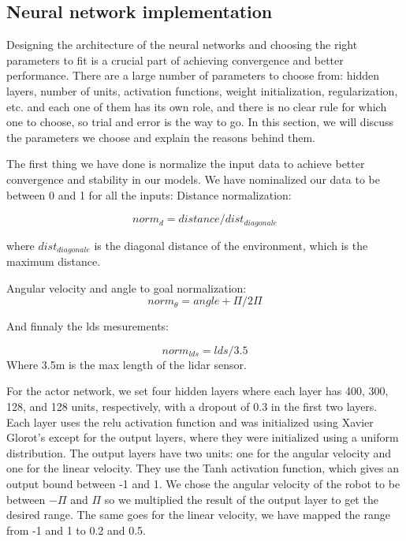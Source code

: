 \documentclass[12pt]{extarticle}
\begin{document}
 
\newpage




\subsection{Neural network implementation}
Designing the architecture of the neural networks and choosing the right parameters to fit is a crucial part of achieving convergence and better performance. There are a large number of parameters to choose from: hidden layers, number of units, activation functions, weight initialization, regularization, etc. and each one of them has its own role, and there is no clear rule for which one to choose, so trial and error is the way to go. In this section, we will discuss the parameters we choose and explain the reasons behind them.
 
The first thing we have done is normalize the input data to achieve better convergence and stability in our models. We have nominalized our data to be between 0 and 1 for all the inputs:
\newpage
Distance normalization:

  \begin{equation} \label{dist_norm}
     norm_d=distance/dist_{diagonale} 
   \end{equation}
   
where $dist_{diagonale}$ is the diagonal distance of the environment, which is the maximum distance.

Angular velocity and angle to goal normalization:
\begin{equation} \label{angle_norm}
     norm_\theta=angle+\Pi/2\Pi
   \end{equation}

And finnaly the lds mesurements:

 \begin{equation} \label{angle_norm}
     norm_{lds}=lds/3.5 
   \end{equation}
  Where 3.5m is the max length of the lidar sensor.
   
For the actor network, we set four hidden layers where each layer has 400, 300, 128, and 128 units, respectively, with a dropout of 0.3 in the first two layers. Each layer uses the relu activation function and was initialized using Xavier Glorot's except for the output layers, where they were initialized using a uniform distribution. The output layers have two units: one for the angular velocity and one for the linear velocity. They use the Tanh activation function, which gives an output bound between -1 and 1. We chose the angular velocity of the robot to be between $-\Pi $ and $\Pi $ so we multiplied the result of the output layer to get the desired range. The same goes for the linear velocity, we have mapped the range from -1 and 1 to 0.2 and 0.5.
\end{document}
